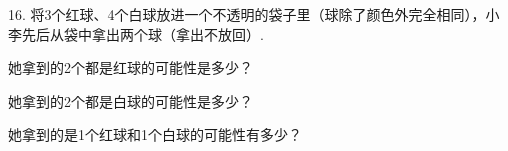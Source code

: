 16.	将3个红球、4个白球放进一个不透明的袋子里（球除了颜色外完全相同），小李先后从袋中拿出两个球（拿出不放回）.

\begin{subquestions}

    \subquestion 她拿到的2个都是红球的可能性是多少？

    \subquestion 她拿到的2个都是白球的可能性是多少？

    \subquestion 她拿到的是1个红球和1个白球的可能性有多少？

\end{subquestions}





